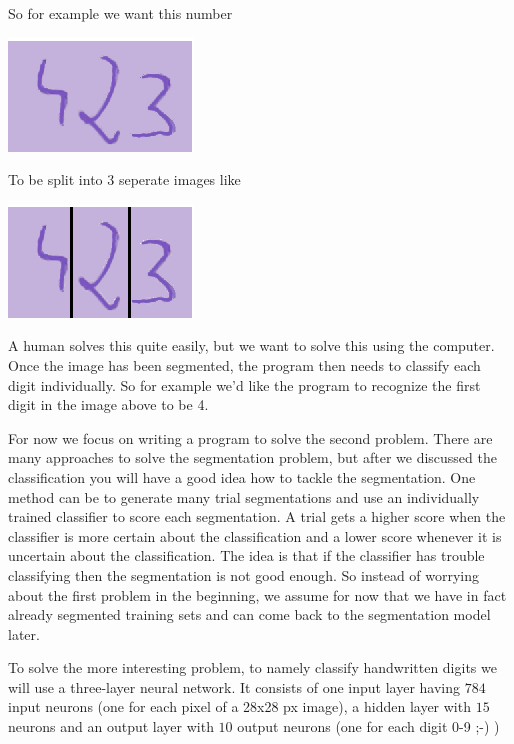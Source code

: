 \documentclass[10pt]{book}
\begin{document}
    \begin{multicols}{2}
        So for example we want this number\\
        \begin{center}
            \includegraphics{digits-complete.eps}
        \end{center}
        \columnbreak

        To be split into 3 seperate images like\\
        \begin{center}
            \includegraphics{digits-split.eps}
        \end{center}
    \end{multicols}
    A human solves this quite easily, but we want to solve this using the computer.
    Once the image has been segmented, the program then needs to classify each digit individually.
    So for example we'd like the program to recognize the first digit in the image above to be 4.

    For now we focus on writing a program to solve the second problem. There are many approaches to solve
    the segmentation problem, but after we discussed the classification you will have a good idea how to tackle
    the segmentation. One method can be to generate many \dq trial\dq \; segmentations and use an individually trained
    classifier to score each segmentation. A trial gets a higher score when the classifier is more certain about the classification
    and a lower score whenever it is uncertain about the classification. The idea is that if the classifier has trouble classifying then
    the segmentation is not good enough. So instead of worrying about the first problem in the beginning, we assume for now that we have
    in fact already segmented training sets and can come back to the segmentation model later.

    To solve the more interesting problem, to namely classify handwritten digits we will use a three-layer neural network.
    It consists of one input layer having \(784\) input neurons (one for each pixel of a 28x28 px image), a hidden layer with \(15\) neurons and an output layer with \(10\) output neurons (one for each digit 0-9 ;-) )
\end{document}
